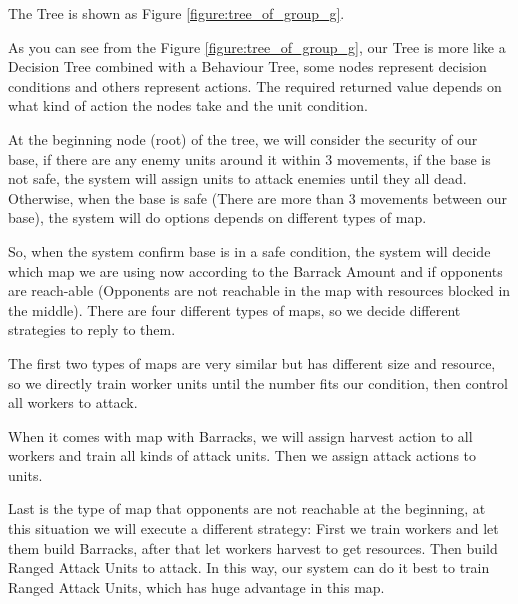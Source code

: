The Tree is shown as Figure \ref{figure:tree_of_group_g}.



As you can see from the Figure \ref{figure:tree_of_group_g}, our Tree is more like a Decision Tree combined with
a Behaviour Tree, some nodes represent decision conditions and others represent actions. The required
returned value depends on what kind of action the nodes take and the unit condition. 

At the beginning node (root) of the tree, we will consider the security of our base, if there are any enemy
units around it within 3 movements, if the base is not safe, the system will assign units to attack enemies
until they all dead. Otherwise, when the base is safe (There are more than 3 movements between our base),
the system will do options depends on different types of map. 

So, when the system confirm base is in a safe condition, the system will decide which map we are using now
according to the Barrack Amount and if opponents are reach-able (Opponents are not reachable in the map with
resources blocked in the middle). There are four different types of maps, so we decide different strategies
to reply to them. 

The first two types of maps are very similar but has different size and resource, so we directly train worker
units until the number fits our condition, then control all workers to attack.



When it comes with map with Barracks, we will assign harvest action to all workers and train all kinds of
attack units. Then we assign attack actions to units.



Last is the type of map that opponents are not reachable at the beginning, at this situation we will execute
a different strategy: First we train workers and let them build Barracks, after that let workers harvest to get
resources. Then build Ranged Attack Units to attack. In this way, our system can do it best to train Ranged Attack
Units, which has huge advantage in this map.
